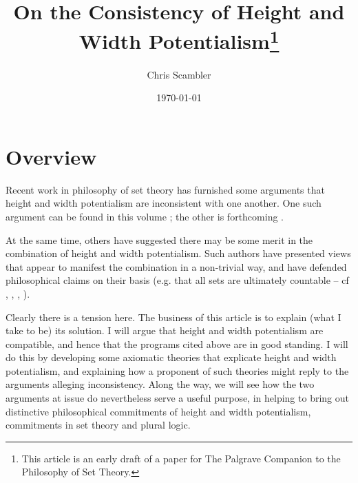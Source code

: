 \documentclass{article}
\title{On the Consistency of Height and Width Potentialism\footnote{
This article is an early draft of a paper for The Palgrave Companion to the Philosophy of Set Theory.}}
\author{Chris Scambler}
\date{\today}
\begin{document}
\maketitle
{}
\section{Overview}


Recent work in philosophy of set theory has furnished 
    some arguments that height and width potentialism 
    are inconsistent with one another. 
    One such argument can be found in this volume \citep{EB2022}; 
    the other is forthcoming \citep{SR2022}.

	At the same time, others have suggested 
    there may be some merit in the combination of 
    height  and width  potentialism. Such authors 
    have presented views that appear to manifest 
    the combination in a non-trivial way, and have 
    defended philosophical claims on their basis 
    (e.g. that all sets are ultimately countable 
    -- cf \citep{BW2022}, \citep{TM2015}, 
    \citep{CS2021}, \citep{AP2020}).  

	Clearly there is a tension here. 
    The business of this article is to explain 
    (what I take to be) its solution.  
I will argue that height  and width  potentialism 
are compatible, and hence that the programs 
cited above are in good standing. 
I will do this by developing some 
axiomatic theories that explicate height 
and width potentialism, and explaining how a proponent 
of such theories might reply to the arguments alleging inconsistency.
Along the way, we will see how the two arguments 
at issue do nevertheless serve a useful purpose, 
in helping to bring out distinctive philosophical 
commitments of height and width potentialism,
commitments in 
set theory and plural logic.
\end{document}
